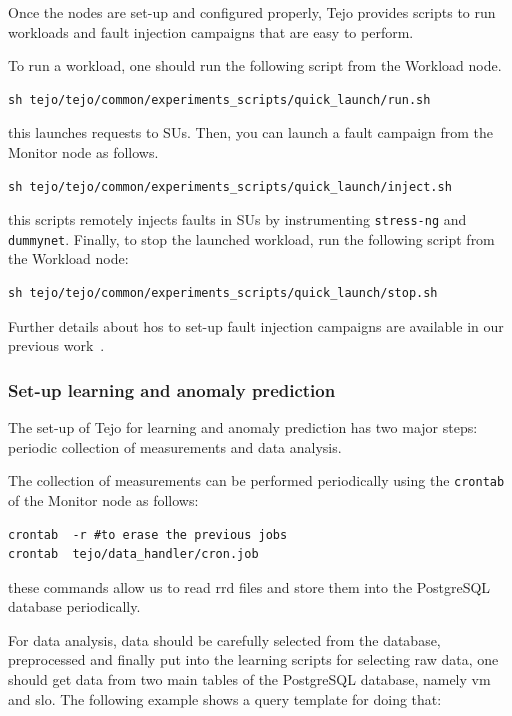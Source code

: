 Once the nodes are set-up and configured properly, Tejo provides scripts to run workloads and fault injection campaigns that are easy to perform.

To run a workload, one should run the following script from the Workload node.

\begin{lstlisting}
sh tejo/tejo/common/experiments_scripts/quick_launch/run.sh
\end{lstlisting}

\noindent
this launches requests to SUs. Then, you can launch a fault campaign from the Monitor node as follows.

\begin{lstlisting}
sh tejo/tejo/common/experiments_scripts/quick_launch/inject.sh
\end{lstlisting}

\noindent
this scripts remotely injects faults in SUs by instrumenting \verb|stress-ng| and \verb|dummynet|. Finally, to stop the launched workload, run the following script from the Workload node:

\begin{lstlisting}
sh tejo/tejo/common/experiments_scripts/quick_launch/stop.sh
\end{lstlisting}

Further details about hos to set-up fault injection campaigns are available in our previous work~\cite{silvestre2014anomaly}.

\subsubsection{Set-up learning and anomaly prediction}

The set-up of Tejo for learning and anomaly prediction has two major steps: periodic collection of measurements and data analysis.

The collection of measurements can be performed periodically using the \verb|crontab| of the Monitor node as follows:
\begin{lstlisting}
crontab  -r #to erase the previous jobs
crontab  tejo/data_handler/cron.job
\end{lstlisting}

\noindent
these commands allow us to read rrd files and store them into the PostgreSQL database periodically.

For data analysis, data should be carefully selected from the database, preprocessed and finally put into the learning scripts for selecting raw data, one should get data from two main tables of the PostgreSQL database, namely vm and slo. The following example shows a query template for doing that:

